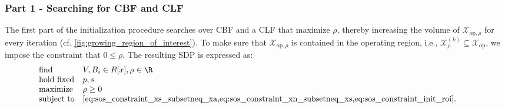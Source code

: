 \subsubsection*{Part 1 - Searching for CBF and CLF}

The first part of the initialization procedure searches over CBF and a CLF that maximize $\rho$, thereby increasing the volume of $\mathcal X_{\text{op}, \rho}$ for every iteration (cf. \cref{fig:growing_region_of_interest}).
To make sure that $\mathcal X_{\text{op}, \rho}$ is contained in the operating region, i.e., $\mathcal X_\rho^{(k)} \subseteq \mathcal X_\text{op}$, we impose the constraint that $0 \leq \rho$.
The resulting SDP is expressed as:
\begin{align} \label{eq:sos_opt_prob_part1}
   \hspace{-\leftmargin}
   \begin{array}{lll}
      \mbox{find} & V, B_i \in R[x], \rho \in \R \\
      \mbox{hold fixed} & p, s \\
      \mbox{maximize} & \rho \geq 0 \\
      \mbox{subject to} & \text{\cref{eq:sos_constraint_xs_subsetneq_xa,eq:sos_constraint_xn_subsetneq_xs,eq:sos_constraint_init_roi}}. \\
   \end{array}
\end{align}

